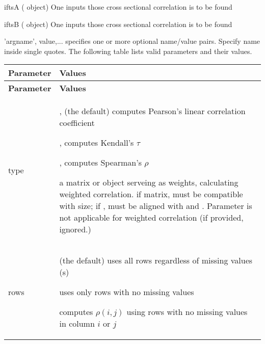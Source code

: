 \inarg
   \begin{argdesc}
	\item[iftsA]	(\myfints{} object) One inputs those cross sectional correlation is to be found
	\item[iftsB]	(\myfints{} object) One inputs those cross sectional correlation is to be found
   \item['argname', value,...] specifies one or more optional name/value pairs. 
        Specify name inside single quotes. 
        The following table lists valid parameters and their values.
		   \begin{longtable}[r]{>{\ttfamily}l<{} p{12.6cm}}
		      \textsf{\textbf{Parameter}} & \textsf{\textbf{Values}}\\
		      \toprule
		      \endfirsthead
		      \textsf{\textbf{Parameter}} & \textsf{\textbf{Values}}\\
		      \toprule
		      \endhead
		      \bottomrule
		      \endfoot
		      \bottomrule
		      \endlastfoot
           type &	\vspace*{-1.28\baselineskip}
             \begin{itemize*}
               \item\mcode{'Pearson'}, (the default) computes Pearson's linear correlation coefficient
               \item\mcode{'Kendall'}, computes Kendall's $\tau$
				    \item\mcode{'Spearman'}, computes Spearman's $\rho$
               \item a matrix or \myfints{} object serveing as weights, calculating weighted correlation.
                if matrix, must be compatible with size;
                if \myfints{}, must be aligned with \mcode{iftsA} and \mcode{iftsB}.
                Parameter \mcode{rows} is not applicable for weighted correlation (if provided, ignored.)\newline
                \vspace*{-2\baselineskip}
             \end{itemize*}\\
           \midrule
           rows & \vspace*{-1.28\baselineskip}
             \begin{itemize*}
              \item \mcode{'all'} (the default) uses all rows regardless of missing values (\mcode{NaN}s)
              \item \mcode{'complete'} uses only rows with no missing values
              \item \mcode{'pairwise'} computes $\rho(i,j)$ using rows with no missing 
                    values in column $i$ or $j$\newline
              \vspace*{-2\baselineskip}
             \end{itemize*}\\
       \end{longtable}
   \end{argdesc}
